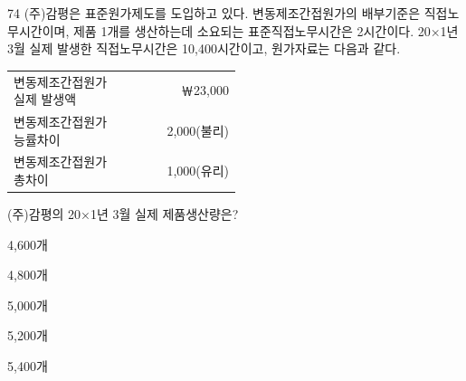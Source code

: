 \begin{question}{74}
(주)감평은 표준원가제도를 도입하고 있다. 변동제조간접원가의 배부기준은 직접노무시간이며, 제품 1개를 생산하는데 소요되는 표준직접노무시간은 2시간이다. 20×1년 3월 실제 발생한 직접노무시간은 10,400시간이고, 원가자료는 다음과 같다.

{\small\centering\begin{tabular}{|p{0.5\linewidth}|r|}\hline
변동제조간접원가 실제 발생액 & ￦23,000 \\
변동제조간접원가 능률차이 & 2,000(불리) \\
변동제조간접원가 총차이 & 1,000(유리) \\ \hline
\end{tabular}\par}
\vspace{4pt}
(주)감평의 20×1년 3월 실제 제품생산량은?
\begin{choices}
  \item 4,600개
  \item 4,800개
  \item 5,000개
  \item 5,200개
  \item 5,400개
\end{choices}
\end{question}
